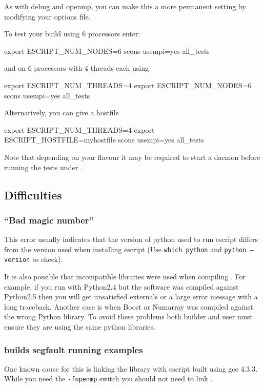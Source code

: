 As with debug and openmp, you can make this a more permanent setting by modifying your options file.

To test your build using 6 processors enter:
\begin{shellCode}
export ESCRIPT_NUM_NODES=6
scons usempi=yes all_tests
\end{shellCode}
and on 6 processors with 4 threads each using 
\begin{shellCode}
export ESCRIPT_NUM_THREADS=4
export ESCRIPT_NUM_NODES=6
scons usempi=yes all_tests
\end{shellCode}
Alternatively, you can give a hostfile
\begin{shellCode}
export ESCRIPT_NUM_THREADS=4
export ESCRIPT_HOSTFILE=myhostfile
scons usempi=yes all_tests
\end{shellCode}
Note that depending on your \mpi flavour it may be required to start a daemon before running the tests under \mpi.


\subsection{Difficulties}

\subsubsection{``Bad magic number''}
This error usually indicates that the version of python used to run escript differs from the version used when installing escript (Use \texttt{which python} and \texttt{python --version} to check).

It is also possible that incompatible libraries were used when compiling \esfinley.
For example, if you run with Python2.4 but the software was compiled against Python2.5 then you will get unsatisfied externals or a large error message with a long traceback.
Another case is when Boost or Numarray was compiled against the wrong Python library.
To avoid these problems both builder and user must ensure they are using the same python libraries.

\subsubsection{\openmp builds segfault running examples}

One known cause for this is linking the  library with escript built using gcc 4.3.3.
While you need the \texttt{-fopenmp} switch you should not need to link .

